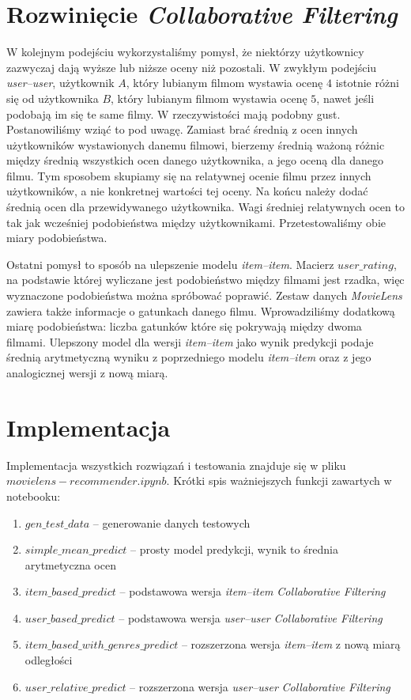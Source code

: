 \documentclass[11pt,wide]{mwart}
\begin{document}
\section{Rozwinięcie \textit{Collaborative Filtering}}

W kolejnym podejściu wykorzystaliśmy pomysł, że niektórzy użytkownicy zazwyczaj dają wyższe lub niższe oceny niż pozostali. W zwykłym podejściu \textit{user--user}, użytkownik $A$, który lubianym filmom wystawia ocenę $4$ istotnie różni się od użytkownika $B$, który lubianym filmom wystawia ocenę $5$, nawet jeśli podobają im się te same filmy. W rzeczywistości mają podobny gust. Postanowiliśmy wziąć to pod uwagę. Zamiast brać średnią z ocen innych użytkowników wystawionych danemu filmowi, bierzemy średnią ważoną różnic między średnią wszystkich ocen danego użytkownika, a jego oceną dla danego filmu. Tym sposobem skupiamy się na relatywnej ocenie filmu przez innych użytkowników, a nie konkretnej wartości tej oceny. Na końcu należy dodać średnią ocen dla przewidywanego użytkownika. Wagi średniej relatywnych ocen to tak jak wcześniej podobieństwa między użytkownikami. Przetestowaliśmy obie miary podobieństwa.

Ostatni pomysł to sposób na ulepszenie modelu \textit{item--item}. Macierz $user\_rating$, na podstawie której wyliczane jest podobieństwo między filmami jest rzadka, więc wyznaczone podobieństwa można spróbować poprawić. Zestaw danych \textit{MovieLens} zawiera także informacje o gatunkach danego filmu. Wprowadziliśmy dodatkową miarę podobieństwa: liczba gatunków które się pokrywają między dwoma filmami. Ulepszony model dla wersji \textit{item--item} jako wynik predykcji podaje średnią arytmetyczną wyniku z poprzedniego modelu \textit{item--item} oraz z jego analogicznej wersji z nową miarą.

\section{Implementacja}
Implementacja wszystkich rozwiązań i testowania znajduje się w pliku $movielens-recommender.ipynb$.
Krótki spis ważniejszych funkcji zawartych w notebooku:
\begin{enumerate}
    \item $gen\_test\_data$ -- generowanie danych testowych
    \item $simple\_mean\_predict$ -- prosty model predykcji, wynik to średnia arytmetyczna ocen
    \item $item\_based\_predict$ -- podstawowa wersja \textit{item--item} \textit{Collaborative Filtering}
    \item $user\_based\_predict$ -- podstawowa wersja \textit{user--user} \textit{Collaborative Filtering}
    \item $item\_based\_with\_genres\_predict$ -- rozszerzona wersja \textit{item--item} z nową miarą odległości
    \item $user\_relative\_predict$ -- rozszerzona wersja \textit{user--user} \textit{Collaborative Filtering}

\end{enumerate}
\end{document}
